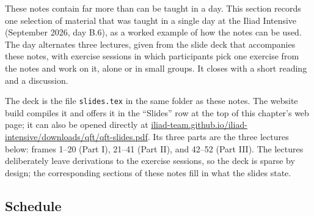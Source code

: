 \documentclass[11pt]{article}
\begin{document}
These notes contain far more than can be taught in a day. This section records one selection of material that was taught in a single day at the Iliad Intensive (September 2026, day B.6), as a worked example of how the notes can be used. The day alternates three lectures, given from the slide deck that accompanies these notes, with exercise sessions in which participants pick one exercise from the notes and work on it, alone or in small groups. It closes with a short reading and a discussion.

The deck is the file \texttt{slides.tex} in the same folder as these notes. The website build compiles it and offers it in the ``Slides'' row at the top of this chapter's web page; it can also be opened directly at \href{https://iliad-team.github.io/iliad-intensive/downloads/qft/qft-slides.pdf}{iliad-team.github.io/iliad-intensive/downloads/qft/qft-slides.pdf}. Its three parts are the three lectures below: frames 1--20 (Part I), 21--41 (Part II), and 42--52 (Part III). The lectures deliberately leave derivations to the exercise sessions, so the deck is sparse by design; the corresponding sections of these notes fill in what the slides state.

\subsection{Schedule}
\label{sec:schedule}
\end{document}
